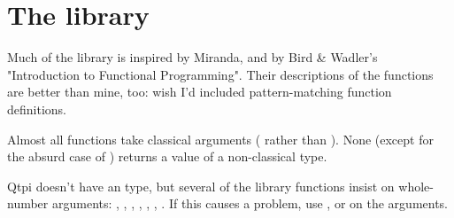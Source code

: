 
\chapter{The library}

\newenvironment{explain}{\list{}{}\item\relax}{\endlist}
\newcommand{\libitem}[2]{\hspace{10pt}\verbtt{#1}\vspace{-\topsep}\vspace{-\parskip}\begin{explain}#2\vspace{-\parskip}\end{explain}}
\newcommand{\libitemS}[1]{\libitem{#1}{\mbox{}\vspace{-\topsep}\vspace{-\topsep}}}
Much of the library is inspired by Miranda, and by Bird \& Wadler's "Introduction to Functional Programming". Their descriptions of the functions are better than mine, too: wish I'd included pattern-matching function definitions.

Almost all functions take classical arguments ( rather than ). None (except for the absurd case of ) returns a value of a non-classical type.
    
Qtpi doesn't have an  type, but several of the library functions insist on whole-number arguments: , , , , , , . If this causes a problem, use ,  or  on the arguments.

